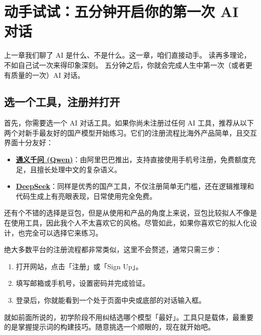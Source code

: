 % 
% 


\chapter{动手试试：五分钟开启你的第一次 AI 对话}
\label{ch:first-try}

上一章我们聊了 AI 是什么、不是什么。这一章，咱们直接动手。
读再多理论，不如自己试一次来得印象深刻。
五分钟之后，你就会完成人生中第一次（或者更有质量的一次）AI 对话。

\section{选一个工具，注册并打开}

首先，你需要选一个 AI 对话工具。如果你尚未注册过任何 AI 工具，推荐从以下两个对新手最友好的国产模型开始练习。它们的注册流程比海外产品简单，且交互界面十分友好：

\begin{itemize}
  \item \href{https://qwen.ai}{\textbf{通义千问 (Qwen)}}：由阿里巴巴推出，支持直接使用手机号注册，免费额度充足，且擅长处理中文的复杂语义。
  \item \href{https://chat.deepseek.com}{\textbf{DeepSeek}}：同样是优秀的国产工具，不仅注册简单无门槛，还在逻辑推理和代码生成上有亮眼表现，日常使用完全免费。
\end{itemize}

还有个不错的选择是豆包，但是从使用和产品的角度上来说，豆包比较拟人不像是在使用工具，因此我个人不太喜欢它的风格。尽管如此，如果你喜欢它的拟人化设计，也完全可以选择它来练习。

绝大多数平台的注册流程都非常类似，这里不会赘述，通常只需三步：

\begin{enumerate}
  \item 打开网站，点击「注册」或「Sign Up」。
  \item 填写邮箱或手机号，设置密码并完成验证。
  \item 登录后，你就能看到一个处于页面中央或底部的对话输入框。
\end{enumerate}

\begin{tipbox}
就如前面所说的，初学阶段不用纠结选哪个模型「最好」。工具只是载体，最重要的是掌握提示词的构建技巧。随意挑选一个顺眼的，现在就开始吧。
\end{tipbox}

